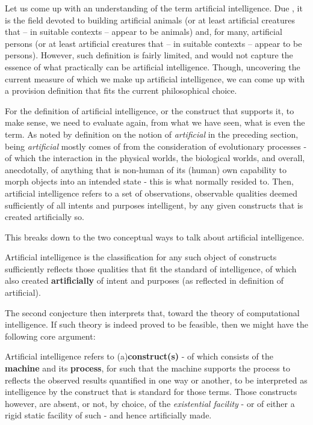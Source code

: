 Let us come up with an understanding of the term artificial intelligence. Due \cite{stanford2018ai}, it is the field devoted to building artificial animals (or at least artificial creatures that – in suitable contexts – appear to be animals) and, for many, artificial persons (or at least artificial creatures that – in suitable contexts – appear to be persons). However, such definition is fairly limited, and would not capture the essence of what practically can be artificial intelligence. Though, uncovering the current measure of which we make up artificial intelligence, we can come up with a provision definition that fits the current philosophical choice. 

For the definition of artificial intelligence, or the construct that supports it, to make sense, we need to evaluate again, from what we have seen, what is even the term. As noted by definition on the notion of \textit{artificial} in the preceding section, being \textit{artificial} mostly comes of from the consideration of evolutionary processes - of which the interaction in the physical worlds, the biological worlds, and overall, anecdotally, of anything that is non-human of its (human) own capability to morph objects into an intended state - this is what normally resided to. Then, artificial intelligence refers to a set of observations, observable qualities deemed sufficiently of all intents and purposes intelligent, by any given constructs that is created artificially so.

This breaks down to the two conceptual ways to talk about artificial intelligence.
\begin{conjecture}\label{conj:conjecture_AI_1}
    Artificial intelligence is the classification for any such object of constructs sufficiently reflects those qualities that fit the standard of intelligence, of which also created \textbf{artificially} of intent and purposes (as reflected in definition of artificial).
\end{conjecture}

The second conjecture then interprets that, toward the theory of computational intelligence. If such theory is indeed proved to be feasible, then we might have the following core argument: 

\begin{conjecture}\label{conj:conjecture_AI_2}
    Artificial intelligence refers to (a)\textbf{construct(s)} - of which consists of the \textbf{machine} and its \textbf{process}, for such that the machine supports the process to reflects the observed results quantified in one way or another, to be interpreted as intelligence by the construct that is standard for those terms. Those constructs however, are absent, or not, by choice, of the \textit{existential facility} - or of either a rigid static facility of such - and hence artificially made.
\end{conjecture}

